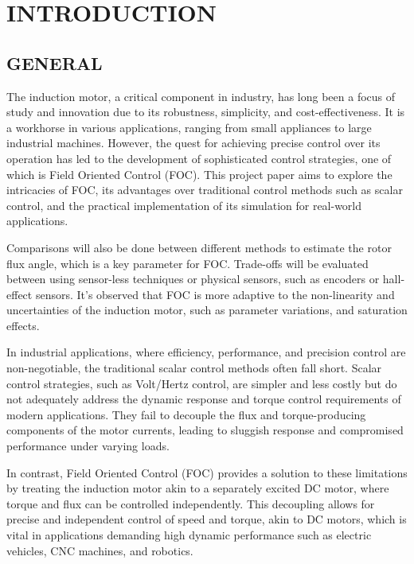 \section{\centering INTRODUCTION}

\subsection{GENERAL}

\hspace{0.2in} The induction motor, a critical component in industry, has long been a focus of study and innovation due to its robustness, simplicity, and cost-effectiveness. It is a workhorse in various applications, ranging from small appliances to large industrial machines. However, the quest for achieving precise control over its operation has led to the development of sophisticated control strategies, one of which is Field Oriented Control (FOC). This project paper aims to explore the intricacies of FOC, its advantages over traditional control methods such as scalar control, and the practical implementation of its simulation for real-world applications.

Comparisons will also be done between different methods to estimate the rotor flux angle, which is a key parameter for FOC. Trade-offs will be evaluated between using sensor-less techniques or physical sensors, such as encoders or hall-effect sensors. It’s observed that FOC is more adaptive to the non-linearity and uncertainties of the induction motor, such as parameter variations, and saturation effects.


In industrial applications, where efficiency, performance, and precision control are non-negotiable, the traditional scalar control methods often fall short. Scalar control strategies, such as Volt/Hertz control, are simpler and less costly but do not adequately address the dynamic response and torque control requirements of modern applications. They fail to decouple the flux and torque-producing components of the motor currents, leading to sluggish response and compromised performance under varying loads.

In contrast, Field Oriented Control (FOC) provides a solution to these limitations by treating the induction motor akin to a separately excited DC motor, where torque and flux can be controlled independently. This decoupling allows for precise and independent control of speed and torque, akin to DC motors, which is vital in applications demanding high dynamic performance such as electric vehicles, CNC machines, and robotics.

